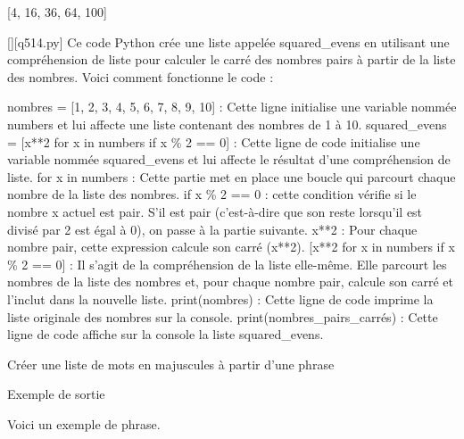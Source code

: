 [4, 16, 36, 64, 100]
        \par
        \begin{solution}
            \renewcommand{\nomfichier}{q514.py}
            \pythonfile{\chemincode \nomfichier}[][\nomfichier]
            Ce code Python crée une liste appelée squared\_evens en utilisant une compréhension de liste pour calculer le carré des nombres pairs à partir de la liste des nombres. Voici comment fonctionne le code :

    nombres = [1, 2, 3, 4, 5, 6, 7, 8, 9, 10] : Cette ligne initialise une variable nommée numbers et lui affecte une liste contenant des nombres de 1 à 10.
    squared\_evens = [x**2 for x in numbers if x \% 2 == 0] : Cette ligne de code initialise une variable nommée squared\_evens et lui affecte le résultat d'une compréhension de liste.
        for x in numbers : Cette partie met en place une boucle qui parcourt chaque nombre de la liste des nombres.
        if x \% 2 == 0 : cette condition vérifie si le nombre x actuel est pair. S'il est pair (c'est-à-dire que son reste lorsqu'il est divisé par 2 est égal à 0), on passe à la partie suivante.
        x**2 : Pour chaque nombre pair, cette expression calcule son carré (x**2).
        [x**2 for x in numbers if x \% 2 == 0] : Il s'agit de la compréhension de la liste elle-même. Elle parcourt les nombres de la liste des nombres et, pour chaque nombre pair, calcule son carré et l'inclut dans la nouvelle liste.
    print(nombres) : Cette ligne de code imprime la liste originale des nombres sur la console.
    print(nombres\_pairs\_carrés) : Cette ligne de code affiche sur la console la liste squared\_evens.
        \end{solution}
        

        \question
        Créer une liste de mots en majuscules à partir d'une phrase

Exemple de sortie

Voici un exemple de phrase.

